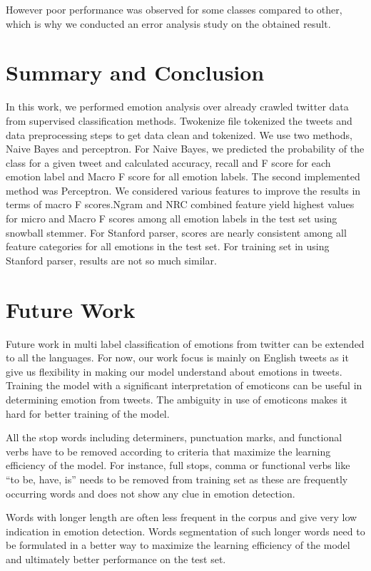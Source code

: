 \documentclass[11pt]{article}
\begin{document}
{  However poor performance was observed for some classes compared to other, which is why we conducted an error analysis study on the obtained result.
  
  
   \section{Summary and Conclusion}
  
  
  In this work, we performed emotion analysis over already crawled twitter data from supervised classification methods. Twokenize file tokenized the tweets and data preprocessing steps to get data clean and tokenized.  We use two methods, Naive Bayes and perceptron.
  For Naive Bayes, we predicted the probability of the class for a given tweet and calculated accuracy, recall and F score for each emotion label and Macro F score for all emotion labels.
  The second implemented method was Perceptron. We considered various features to improve the results in terms of macro F scores.Ngram and NRC combined feature yield highest values for micro and Macro F scores among all emotion labels in the test set using snowball stemmer. For Stanford parser, scores are nearly consistent among all feature categories for all emotions in the test set.
  For training set in using Stanford parser, results are not so much similar.
  \\
  \section{Future Work}
  
  Future work in multi label classification of emotions from twitter can be extended to all the languages. For now, our work focus is mainly on
  English tweets as it give us flexibility in making our model understand about emotions in tweets. Training the model with a significant interpretation of emoticons can be useful in determining emotion from tweets. The ambiguity in use of emoticons makes it hard for better training of the model.
  
  
  All the stop words including determiners, punctuation marks, and functional verbs have to be removed according to criteria that maximize the learning efficiency of the model. For instance, full stops, comma or functional verbs like “to be, have,
  is” needs to be removed from training set as these are frequently occurring words and does not show any clue in emotion detection.
  
  
  Words with longer length are often less frequent in the corpus and give very low indication in emotion detection. Words segmentation of such longer
  words need to be formulated in a better way to maximize the learning efficiency of the model and ultimately better performance on the test set.
   
}
\end{document}
